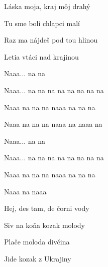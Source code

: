 \begin{song}
\bigskip

 \par
{}Láska moja, kraj môj drahý \par
{}Tu sme boli chlapci malí \par
{}Raz ma nájdeš pod tou hlinou \par
{}Letia vtáci nad krajinou \par

\bigskip

\Refren

\bigskip


 \par
{}Naaa...   na na \par
{}Naaa... na na na na na na na na \par
{}Naaa na na na naaa na na na \par
{}Naaa na na na naaa na naaa na \par

\bigskip

Naaa...   na na \par
{}Naaa... na na na na na na na na \par
{}Naaa na na na naaa na na na \par
{}Naaa na naaa  \par

\bigskip



 \par
{}Hej, des tam, de čorni vody \par
{}Siv na koňa kozak molody \par
{}Plače moloda divčina \par
{}Jide kozak z Ukrajiny \par

\bigskip

\Refren

\end{song}
